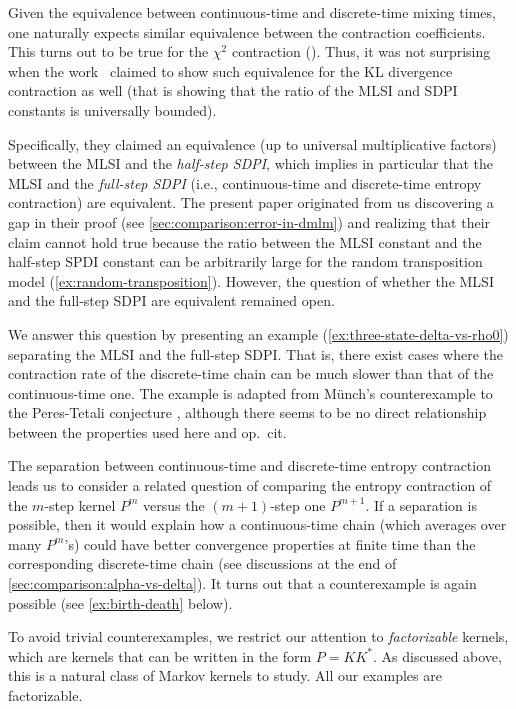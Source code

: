 \documentclass[11pt]{article}
\theoremstyle{definition}
\begin{document}
Given the equivalence between continuous-time and discrete-time mixing times, one naturally expects similar equivalence
between the contraction coefficients. This turns out to be true for the $\chi^2$ contraction (\cite[Remark 4.2]{raginsky2016strong}). Thus, it was not surprising when the work~\cite{del2003contraction} claimed to
show such equivalence for the KL divergence contraction as well (that is showing that the ratio of
the MLSI and SDPI constants is universally bounded).
{%
Specifically, they claimed an equivalence (up to universal multiplicative factors) between the MLSI and the \emph{half-step SDPI}, which implies in particular that the MLSI and the \emph{full-step SDPI} (i.e., continuous-time and discrete-time entropy contraction) are equivalent. The present paper originated from us discovering a gap in their proof (see \cref{sec:comparison:error-in-dmlm}) and realizing that their claim cannot hold true because the ratio between the MLSI constant and the half-step SPDI constant can be arbitrarily large for the random transposition model (\cref{ex:random-transposition}).
However, the question of whether the MLSI and the full-step SDPI are equivalent remained open.

We answer this question by presenting an example (\cref{ex:three-state-delta-vs-rho0}) separating the MLSI and the full-step SDPI. That is, there exist cases where the contraction rate of the discrete-time chain can be much slower than that of the continuous-time one. The example is adapted from M\"{u}nch's counterexample to the Peres-Tetali conjecture \cite{Mun23}, although there seems to be no direct relationship between the properties used here and op.~cit.

The separation between continuous-time and discrete-time entropy contraction leads us to consider a related question of comparing the entropy contraction of the $m$-step kernel $P^m$ versus the $(m+1)$-step one $P^{m+1}$. If a separation is possible, then it would explain how a continuous-time chain (which averages over many $P^m$'s) could have better convergence properties at finite time than the corresponding discrete-time chain (see discussions at the end of \cref{sec:comparison:alpha-vs-delta}). It turns out that a counterexample is again possible (see \cref{ex:birth-death} below).

To avoid trivial counterexamples, we restrict our attention to \emph{factorizable} kernels, which are kernels that can be written in the form $P=KK^*$. As discussed above, this is a natural class of Markov kernels to study. All our examples are factorizable.
}
\end{document}
